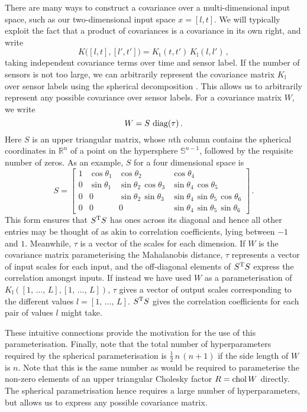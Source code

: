 \documentclass{acmsmall}
\newcommand{\Kl}[1]{K_{\text{#1}}}
\begin{document}
There are many ways to construct a covariance over a multi-dimensional input space, such as our two-dimensional input space $x=[l,t]$. We will typically exploit the fact that a product of covariances is a covariance in its own right, and write
 $$
K\big([l,t],[l',t']\big) =  \Kl{t}(t,t')\,\Kl{l}(l,l')\,,
$$
taking independent covariance terms over time and sensor label. If the number of sensors is not too large, we can arbitrarily represent the covariance matrix $\Kl{l}$ over sensor labels using the spherical decomposition \cite{PinheiroBates}. This allows us to arbitrarily represent any possible covariance over sensor labels. For a covariance matrix $W$, we write
\begin{equation} \label{eq:spherical_W}
 W={S}\,\diag({\tau})\,.
\end{equation}
Here ${S}$ is an upper triangular matrix, whose $n$th column contains the spherical coordinates in $\mathbb{R}^n$ of a point on the hypersphere $\mathbb{S}^{n-1}$, followed by the requisite number of zeros. As an example, $S$ for a four dimensional space is
\begin{equation} \label{eq:spherical}
 S=\left[ \begin{array}{llll}
1 & \cos{\theta_1} 	& \cos{\theta_2} 			& \cos{\theta_4} \\
0 & \sin{\theta_1} 	& \sin{\theta_2}\,\cos{\theta_3} 	& \sin{\theta_4}\,\cos{\theta_5} \\
0 & 0 			& \sin{\theta_2}\,\sin{\theta_3} 	& \sin{\theta_4}\,\sin{\theta_5}\,\cos{\theta_6} \\
0 & 0 			& 0				 	& \sin{\theta_4}\,\sin{\theta_5}\,\sin{\theta_6} 
   \end{array} \right]\,.
\end{equation}
This form ensures that $S^{\mathrm{T}} S$ has ones across its diagonal and hence all other entries may be thought of as akin to correlation coefficients, lying between $-1$ and $1$. Meanwhile, ${\tau}$ is a vector of the scales for each dimension. If $W$ is the covariance matrix parameterising the Mahalanobis distance, $\tau$ represents a vector of input scales for each input, and the off-diagonal elements of $S^{\mathrm{T}} S$ express the correlation amongst inputs. If instead we have used $W$ as a parameterisation of $\Kl{l}([1,\,\ldots,\,L],[1,\,\ldots,\,L])$, $\tau$ gives a vector of output scales corresponding to the different values $l=[1,\,\ldots,\,L]$. $S^{\mathrm{T}} S$ gives the correlation coefficients for each pair of values $l$ might take.

These intuitive connections provide the motivation for the use of this parameterisation. Finally, note that the total number of hyperparameters required by the spherical parameterisation is $\frac{1}{2}\,n\,(n+1)$ if the side length of $W$ is $n$. Note that this is the same number as would be required to parameterise the non-zero elements of an upper triangular Cholesky factor $R=\operatorname{chol}{W}$ directly. The spherical parametrisation hence requires a large number of hyperparameters, but allows us to express any possible covariance matrix.
\end{document}
